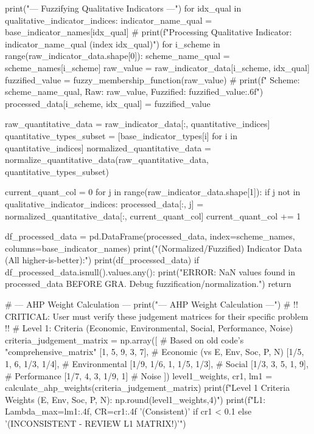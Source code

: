 \documentclass[12pt]{ctexart}
\begin{document}
\begin{python}
    print("\n--- Fuzzifying Qualitative Indicators ---")
    for idx_qual in qualitative_indicator_indices:
        indicator_name_qual = base_indicator_names[idx_qual]
        # print(f"Processing Qualitative Indicator: {indicator_name_qual} (index {idx_qual})")
        for i_scheme in range(raw_indicator_data.shape[0]):
            scheme_name_qual = scheme_names[i_scheme]
            raw_value = raw_indicator_data[i_scheme, idx_qual]
            fuzzified_value = fuzzy_membership_function(raw_value)
            # print(f"  Scheme: {scheme_name_qual}, Raw: {raw_value}, Fuzzified: {fuzzified_value:.6f}")
            processed_data[i_scheme, idx_qual] = fuzzified_value
    
    raw_quantitative_data = raw_indicator_data[:, quantitative_indices]
    quantitative_types_subset = [base_indicator_types[i] for i in quantitative_indices]
    normalized_quantitative_data = normalize_quantitative_data(raw_quantitative_data, quantitative_types_subset)
    
    current_quant_col = 0
    for j in range(raw_indicator_data.shape[1]):
        if j not in qualitative_indicator_indices:
            processed_data[:, j] = normalized_quantitative_data[:, current_quant_col]
            current_quant_col += 1
            
    df_processed_data = pd.DataFrame(processed_data, index=scheme_names, columns=base_indicator_names)
    print("\nProcessed (Normalized/Fuzzified) Indicator Data (All higher-is-better):")
    print(df_processed_data)
    if df_processed_data.isnull().values.any():
        print("ERROR: NaN values found in processed_data BEFORE GRA. Debug fuzzification/normalization.")
        return


    # --- AHP Weight Calculation ---
    print("\n--- AHP Weight Calculation ---")
    # !! CRITICAL: User must verify these judgement matrices for their specific problem !!
    # Level 1: Criteria (Economic, Environmental, Social, Performance, Noise)
    criteria_judgement_matrix = np.array([ # Based on old code's "comprehensive_matrix"
        [1,     5,    9,    3,    7],    # Economic (vs E, Env, Soc, P, N)
        [1/5,   1,    6,    1/3,  1/4],  # Environmental
        [1/9,   1/6,  1,    1/5,  1/3],  # Social
        [1/3,   3,    5,    1,    9],    # Performance
        [1/7,   4,    3,    1/9,  1]     # Noise
    ])
    level1_weights, cr1, lm1 = calculate_ahp_weights(criteria_judgement_matrix)
    print(f"Level 1 Criteria Weights (E, Env, Soc, P, N): {np.round(level1_weights,4)}")
    print(f"L1: Lambda_max={lm1:.4f}, CR={cr1:.4f} {'(Consistent)' if cr1 < 0.1 else '(INCONSISTENT - REVIEW L1 MATRIX!)'}")


\end{python}
\end{document}
